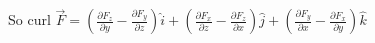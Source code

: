 \documentclass[preview]{standalone}
\begin{document}
\begin{center}
So curl $\vec{F} = (\frac{\partial F_{z}}{\partial y} - \frac{\partial F_{y}}{\partial z}) \hat{i} + (\frac{\partial F_{x}}{\partial z} - \frac{\partial F_{z}}{\partial x}) \hat{j} + (\frac{\partial F_{y}}{\partial x} - \frac{\partial F_{x}}{\partial y}) \hat{k}$
\end{center}
\end{document}

